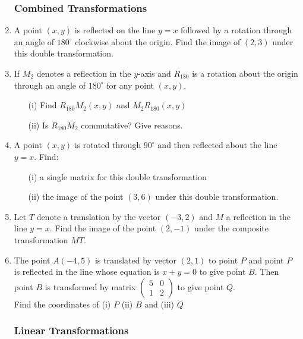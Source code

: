 \begin{enumerate}
			\subsubsection{Combined Transformations}
			
	\item A point $(x,y)$ is reflected on the line $y = x$ followed by a rotation through an angle of $180^\circ$ clockwise about the origin. Find the image of $(2,3)$ under this double transformation.
	
	\item If $M_2$ denotes a reflection in the $y$-axis and $R_{180}$ is a rotation about the origin through an angle of $180^\circ$ for any point $(x,y)$,
		\begin{itemize}
		\item[(i)] Find $R_{180}M_2 (x,y)$ and $M_2R_{180} (x,y)$
		\item[(ii)] Is $R_{180}M_2$ commutative? Give reasons.
		\end{itemize}
		
	\item A point $(x,y)$ is rotated through $90^\circ$ and then reflected about the line $y = x$. Find:
		\begin{itemize}
		\item[(i)] a single matrix for this double transformation
		\item[(ii)] the image of the point $(3,6)$ under this double transformation.
		\end{itemize}
		
	\item Let $T$ denote a translation by the vector $(-3,2)$ and $M$ a reflection in the line $y = x$. Find the image of the point $(2,-1)$ under the composite transformation $MT$.
	
	\item The point $A(-4,5)$ is translated by vector $(2,1)$ to point $P$ and point $P$ is reflected in the line whose equation is $x + y = 0$ to give point $B$. Then point $B$ is transformed by matrix $
	\begin{pmatrix}
	5 & 0 \\
	1 & 2
	\end{pmatrix}$ to give point $Q$.\\
	Find the coordinates of	\quad (i) $P$ \quad (ii) $B$ \quad and \quad (iii) $Q$
	
	
			\subsubsection{Linear Transformations}
			

\end{enumerate}
